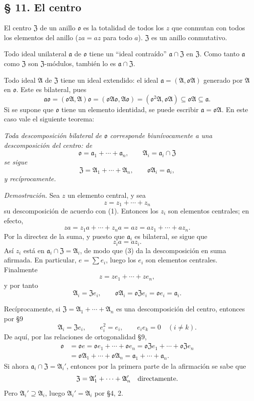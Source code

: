 \documentclass[11pt]{article}
\providecommand{\mA}{\mathfrak{A}}
\providecommand{\mo}{\mathfrak{o}}
\providecommand{\ma}{\mathfrak{a}}
\providecommand{\mZ}{\mathfrak{Z}}
\begin{document}
\subsection*{§ 11. El centro}

El centro $\mZ$ de un anillo $\mo$ es la totalidad de todos los $z$ que conmutan con todos los elementos del anillo ($za=az$ para todo $a$). $\mZ$ es un anillo conmutativo.

Todo ideal unilateral $\ma$ de $\mo$ tiene un ``ideal contraído'' $\ma\cap\mZ$ en $\mZ$. Como tanto $\ma$ como $\mZ$ son $\mZ$-módulos, también lo es $\ma\cap\mZ$.

Todo ideal $\mA$ de $\mZ$ tiene un ideal extendido: el ideal $\ma=(\mA,\mo\mA)$ generado por $\mA$ en $\mo$. Este es bilateral, pues
\[
        \ma\mo=(\mo\mA,\mA)\mo=(\mo\mA\mo,\mA\mo)
        = (\mo^2\mA,\mo\mA)\subseteq \mo\mA\subseteq\ma.
\]
Si se supone que $\mo$ tiene un elemento identidad, se puede escribir $\ma=\mo\mA$. En este caso vale el siguiente teorema:

\emph{Toda descomposición bilateral de $\mo$ corresponde biunívocamente a una descomposición del centro: de}
\begin{equation}
        \mo=\ma_1+\cdots+\ma_n,
        \qquad \mA_i=\ma_i\cap\mZ                         \tag{1}
\end{equation}
\emph{se sigue}
\begin{equation}
        \mZ=\mA_1+\cdots+\mA_n,
        \qquad \mo\mA_i=\ma_i,                              \tag{2}
\end{equation}
\emph{y recíprocamente.}

\emph{Demostración.} Sea $z$ un elemento central, y sea
\begin{equation}
        z=z_1+\cdots+z_n                                    \tag{3}
\end{equation}
su descomposición de acuerdo con (1). Entonces los $z_i$ son elementos centrales; en efecto,
\[
        za=z_1a+\cdots+z_na=az=az_1+\cdots+az_n.
\]
Por la directez de la suma, y puesto que $\ma_i$ es bilateral, se sigue que
\[
        z_i a=az_i.
\]
Así $z_i$ está en $\ma_i\cap\mZ=\mA_i$, de modo que (3) da la descomposición en suma afirmada. En particular, $e=\sum e_i$, luego los $e_i$ son elementos centrales. Finalmente
\[
        z=ze_1+\cdots+ze_n,
\]
y por tanto
\[
        \mA_i=\mZ e_i,
        \qquad
        \mo\mA_i=\mo\mZ e_i=\mo e_i=\ma_i.
\]

Recíprocamente, si $\mZ=\mA_1+\cdots+\mA_n$ es una descomposición del centro, entonces por §9
\[
        \mA_i=\mZ e_i,
        \qquad e_i^2=e_i,
        \qquad e_i e_k=0\quad(i\ne k).
\]
De aquí, por las relaciones de ortogonalidad \hbox{§9},
\[
\begin{aligned}
        \mo&=\mo e=\mo e_1+\cdots+\mo e_n
        =\mo\mZ e_1+\cdots+\mo\mZ e_n\\
        &=\mo\mA_1+\cdots+\mo\mA_n
        =\ma_1+\cdots+\ma_n .
\end{aligned}
\]
Si ahora $\ma_i\cap\mZ=\mA_i'$, entonces por la primera parte de la afirmación se sabe que
\[
        \mZ=\mA_1'+\cdots+\mA_n'\quad\hbox{directamente}.
\]
Pero $\mA_i'\supseteq\mA_i$, luego $\mA_i'=\mA_i$ por §4, 2.
\end{document}

